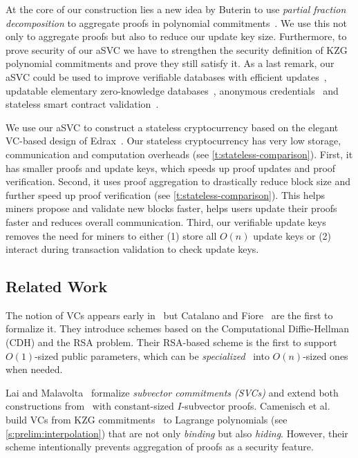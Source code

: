 At the core of our construction lies a new idea by Buterin to use \textit{partial fraction decomposition} to aggregate proofs in polynomial commitments~\cite{Buterin20UsingPoly}.
We use this not only to aggregate proofs but also to reduce our update key size.
Furthermore, to prove security of our aSVC we have to strengthen the security definition of KZG polynomial commitments and prove they still satisfy it.
As a last remark, our aSVC could be used to improve verifiable databases with efficient updates~\cite{BGV11}, updatable elementary zero-knowledge databases~\cite{CF13}, anonymous credentials~\cite{KZG10a} and stateless smart contract validation~\cite{GRWZ20}.

\tableStatelessComparison

We use our aSVC to construct a stateless cryptocurrency based on the elegant VC-based design of Edrax~\cite{CPZ18}.
Our stateless cryptocurrency has very low storage, communication and computation overheads (see \cref{t:stateless-comparison}).
First, it has smaller proofs and update keys, which speeds up proof updates and proof verification.
Second, it uses proof aggregation to drastically reduce block size and further speed up proof verification (see \cref{t:stateless-comparison}).
This helps miners propose and validate new blocks faster, helps users update their proofs faster and reduces overall communication.
Third, our verifiable update keys removes the need for miners to either (1) store all $O(n)$ update keys or (2) interact during transaction validation to check update keys.

\subsection{Related Work}
\label{s:related-work}

The notion of VCs appears early in~\cite{CFM08,LY10,KZG10a} but Catalano and Fiore~\cite{CF13} are the first to formalize it.
They introduce schemes based on the Computational Diffie-Hellman (CDH) and the RSA problem.
Their RSA-based scheme is the first to support $O(1)$-sized public parameters, which can be \textit{specialized}~\cite{CFG+20} into $O(n)$-sized ones when needed.

Lai and Malavolta~\cite{LM19} formalize \textit{subvector commitments (SVCs)} and extend both constructions from~\cite{CF13} with constant-sized $I$-subvector proofs.
Camenisch et al.~\cite{CDHK15} build VCs from KZG commitments~\cite{KZG10a} to Lagrange polynomials (see \cref{s:prelim:interpolation}) that are not only \textit{binding} but also \textit{hiding}.
However, their scheme intentionally prevents aggregation of proofs as a security feature.

